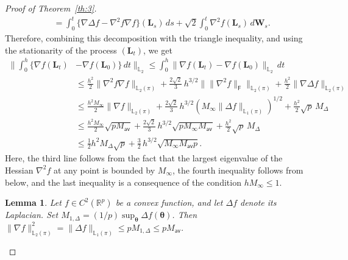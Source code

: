 \documentclass[aos,reqno]{imsart}
\newcommand\bL{\boldsymbol L}
\newcommand\bW{\boldsymbol W}
\newcommand\btheta{\boldsymbol\theta}
\def\Mav{M_{\textsf{av}}}
\def\Mmax{M_{\infty}}
\newtheorem{lemma}{Lemma}
\theoremstyle{definition}
\begin{document}
\begin{proof}[Proof of Theorem~\ref{th:3}]
\begin{align}
    &= \int_0^t\big\{\nabla \Delta  f - \nabla^2 
    f \nabla f\big\}(\bL_s)\,ds +
    \sqrt{2} \int_0^t \nabla^2 f(\bL_s) \,d\bW_s.
    \label{eq:4:7}
\end{align}
Therefore, combining this decomposition with 
the triangle inequality, and using the stationarity of 
the process $(\bL_t)$, we get
\begin{align}
    \Big\|\int_0^h \{\nabla f(\bL_t) &- \nabla f(\bL_0)\}\,dt
    \Big\|_{\mathbb L_2}  \leqslant \int_0^h \big\|\nabla f
    (\bL_t) - \nabla f(\bL_0)\big\|_{\mathbb L_2}\,dt\\
    & \leqslant \frac{h^2}{2}
    \|\nabla^2 f  \nabla f\|_{\mathbb L_2(\pi)}
    + \frac{2\sqrt{2}}{3}\,h^{3/2} \|\|\nabla^2 f
    \|_{\mathsf F}\|_{\mathbb L_2(\pi)} + \frac{h^2}{2} \|
    \nabla \Delta f\|_{\mathbb L_2(\pi)}\\
    &\leqslant \frac{h^2\Mmax}{2} \|\nabla f\|_{\mathbb
    L_2(\pi)} + \frac{2\sqrt{2}}{3}\,h^{3/2} (\Mmax \|
    \Delta f \|_{\mathbb L_1(\pi)})^{1/2} + \frac{h^2}{2}
    \sqrt{p}\,M_\Delta\\
    &\leqslant \frac{h^2\Mmax}{2} \sqrt{p \Mav} + \frac{2 
    \sqrt{2}}{3}\,h^{3/2} \sqrt{p\Mmax \Mav} + \frac{
    h^2}{2} \sqrt{p}\,M_\Delta\\
    &\leqslant \frac12 h^2  M_\Delta
    \sqrt{p} + \frac{3}{2}\,h^{3/2} \sqrt{\Mmax
    \Mav p}.\label{eq:4:5}
\end{align}
Here, the third line follows from the fact that the 
largest eigenvalue of the Hessian $\nabla^2 f$ at any 
point is bounded by $\Mmax$, the fourth inequality follows 
from  below, and the last inequality is
a consequence of the condition $h\Mmax\leqslant 1$.

\begin{lemma}\label{lem:7}
    Let $f\in C^2(\mathbb R^p)$ be a convex function, and
    let $\Delta f$ denote its Laplacian. Set
    $M_{1,\Delta} = (1/p)\sup_{\btheta} \Delta f(\btheta)$.
    Then $\|\nabla f\|_{\mathbb L_2(\pi)}^2 = \|\Delta f
    \|_{\mathbb L_1(\pi)}\leqslant pM_{1,\Delta} \leqslant
    p\Mav$.
\end{lemma}


\end{proof}
\end{document}
